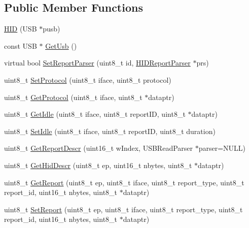 \subsection*{\-Public \-Member \-Functions}
\begin{DoxyCompactItemize}
\item 
\hyperlink{class_h_i_d_acea6b13146dc6fb351a912382ce806fd}{\-H\-I\-D} (\-U\-S\-B $\ast$pusb)
\item 
const \-U\-S\-B $\ast$ \hyperlink{class_h_i_d_afd4bcb073a263f662dd5433139d6ebf3}{\-Get\-Usb} ()
\item 
virtual bool \hyperlink{class_h_i_d_ae3b964d20c828fb27076f50d220fe275}{\-Set\-Report\-Parser} (uint8\-\_\-t id, \hyperlink{class_h_i_d_report_parser}{\-H\-I\-D\-Report\-Parser} $\ast$prs)
\item 
uint8\-\_\-t \hyperlink{class_h_i_d_a276ec67d360b59c3144d7ea2e2f5149e}{\-Set\-Protocol} (uint8\-\_\-t iface, uint8\-\_\-t protocol)
\item 
uint8\-\_\-t \hyperlink{class_h_i_d_a70be6b7ad992954b8648d7d06e2d4e2b}{\-Get\-Protocol} (uint8\-\_\-t iface, uint8\-\_\-t $\ast$dataptr)
\item 
uint8\-\_\-t \hyperlink{class_h_i_d_a52f9c963ffe4715829ff1b84a9eac24c}{\-Get\-Idle} (uint8\-\_\-t iface, uint8\-\_\-t report\-I\-D, uint8\-\_\-t $\ast$dataptr)
\item 
uint8\-\_\-t \hyperlink{class_h_i_d_a6b27ed48d16c6ab09a5ea9a97a628149}{\-Set\-Idle} (uint8\-\_\-t iface, uint8\-\_\-t report\-I\-D, uint8\-\_\-t duration)
\item 
uint8\-\_\-t \hyperlink{class_h_i_d_abecb44a94d722becd9b95788e46d90c3}{\-Get\-Report\-Descr} (uint16\-\_\-t w\-Index, \-U\-S\-B\-Read\-Parser $\ast$parser=\-N\-U\-L\-L)
\item 
uint8\-\_\-t \hyperlink{class_h_i_d_a13dccfb3aa8144626ba587969e3ef3b0}{\-Get\-Hid\-Descr} (uint8\-\_\-t ep, uint16\-\_\-t nbytes, uint8\-\_\-t $\ast$dataptr)
\item 
uint8\-\_\-t \hyperlink{class_h_i_d_a4b59be9ba5dbdc09d2e47cf734c02fdc}{\-Get\-Report} (uint8\-\_\-t ep, uint8\-\_\-t iface, uint8\-\_\-t report\-\_\-type, uint8\-\_\-t report\-\_\-id, uint16\-\_\-t nbytes, uint8\-\_\-t $\ast$dataptr)
\item 
uint8\-\_\-t \hyperlink{class_h_i_d_a58ca963ba0f12d2a457cb247595f38e9}{\-Set\-Report} (uint8\-\_\-t ep, uint8\-\_\-t iface, uint8\-\_\-t report\-\_\-type, uint8\-\_\-t report\-\_\-id, uint16\-\_\-t nbytes, uint8\-\_\-t $\ast$dataptr)
\end{DoxyCompactItemize}
